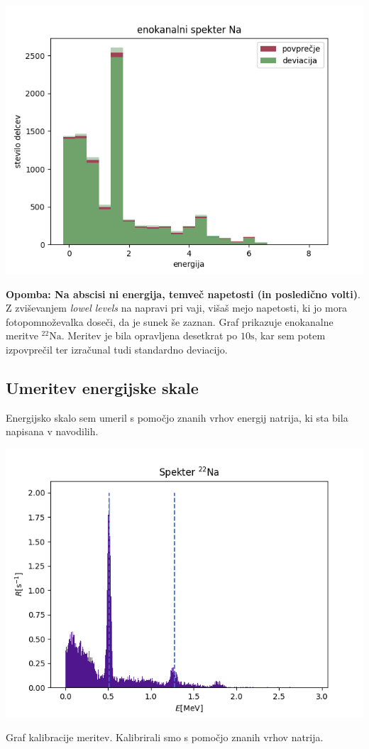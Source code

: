 \documentclass[11pt]{article}
\begin{document}
\begin{slika}[H]
\begin{center}
\includegraphics[width=.9\linewidth]{figures/enokanalni_na.png}
\caption{\small \textbf{Opomba: Na abscisi ni energija, temveč napetosti (in posledično volti)}. Z zviševanjem \emph{lowel levels} na napravi pri vaji, višaš mejo napetosti, ki jo mora fotopomnoževalka doseči, da je sunek še zaznan.  Graf prikazuje enokanalne meritve $^{22} \mathrm{Na}$. Meritev je bila opravljena desetkrat po $10 \mathrm{s}$, kar sem potem izpovprečil ter izračunal tudi standardno deviacijo. } \label{fig:eno}
\end{center}
\end{slika}

\subsection{Umeritev energijske skale}\label{sec:orgb47b656}

Energijsko skalo sem umeril s pomočjo znanih vrhov energij natrija, ki sta bila napisana v navodilih.

\begin{slika}[H]
\begin{center}
\includegraphics[width=.9\linewidth]{figures/kalibracija.png}
\caption{\small Graf kalibracije meritev. Kalibrirali smo s pomočjo znanih vrhov natrija. }
\end{center}
\end{slika}
\end{document}
